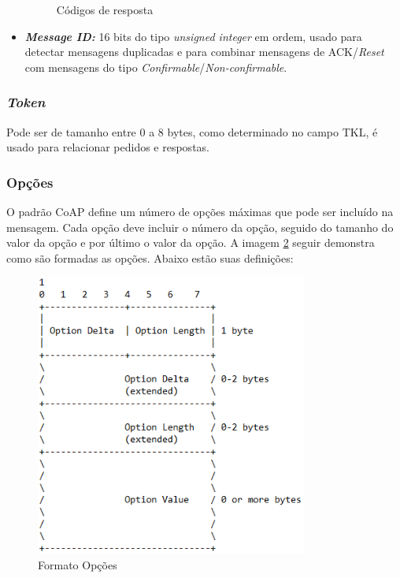 \begin{itemize}
\begin{figure}[!htb]
		\caption{Códigos de resposta}
		\label{fig:cod_resp}
	\end{figure}
	\item \textit{\textbf{Message ID:}} 16 bits do tipo \textit{unsigned integer} em ordem, usado para detectar mensagens duplicadas e para combinar mensagens de ACK/\textit{Reset} com mensagens do tipo \textit{Confirmable}/\textit{Non-confirmable}.
\end{itemize}

\subsubsection {\textit{Token}}

Pode ser de tamanho entre 0 a 8 bytes, como determinado no campo TKL, é usado para relacionar pedidos e respostas.

\subsubsection {Opções}
\label{subsubsubsection{coap_option}}

O padrão CoAP define um número de opções máximas que pode ser incluído na mensagem. Cada opção deve incluir o número da opção, seguido do tamanho do valor da opção e por último o valor da opção. A imagem \ref{fig:opcoes_format} seguir demonstra como são formadas as opções. Abaixo estão suas definições:
\begin{figure}[!htb]
	\centering
	\includegraphics[width=0.8\textwidth]{OPTIONS}
	\caption{Formato Opções}
	\label{fig:opcoes_format}
\end{figure}

